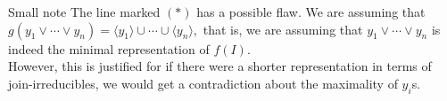 \documentclass[handout, aspectratio=169]{beamer}
\begin{document}
\begin{frame}{Small note}
	The line marked $(*)$ has a possible flaw. We are assuming that $ g(y_1 \vee \cdots \vee y_n) = \langle y_1\rangle\cup\cdots\cup\langle y_n\rangle,$ that is, we are assuming that $y_1 \vee \cdots \vee y_n$ is indeed the minimal representation of $f(I).$\\
	However, this is justified for if there were a shorter representation in terms of join-irreducibles, we would get a contradiction about the maximality of $y_i$s.
\end{frame}
\end{document}
